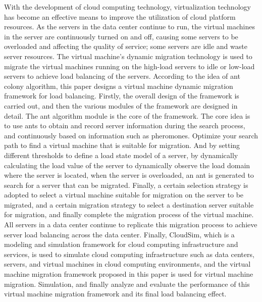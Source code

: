 \begin{enabstract}
  With the development of cloud computing technology, virtualization technology has become an effective means to improve the utilization of cloud platform resources. As the servers in the data center continue to run, the virtual machines in the server are continuously turned on and off, causing some servers to be overloaded and affecting the quality of service; some servers are idle and waste server resources. The virtual machine's dynamic migration technology is used to migrate the virtual machines running on the high-load servers to idle or low-load servers to achieve load balancing of the servers.
According to the idea of ant colony algorithm, this paper designs a virtual machine dynamic migration framework for load balancing. Firstly, the overall design of the framework is carried out, and then the various modules of the framework are designed in detail. The ant algorithm module is the core of the framework. The core idea is to use ants to obtain and record server information during the search process, and continuously based on information such as pheromones. Optimize your search path to find a virtual machine that is suitable for migration. And by setting different thresholds to define a load state model of a server, by dynamically calculating the load value of the server to dynamically observe the load domain where the server is located, when the server is overloaded, an ant is generated to search for a server that can be migrated. Finally, a certain selection strategy is adopted to select a virtual machine suitable for migration on the server to be migrated, and a certain migration strategy to select a destination server suitable for migration, and finally complete the migration process of the virtual machine. All servers in a data center continue to replicate this migration process to achieve server load balancing across the data center.
Finally, CloudSim, which is a modeling and simulation framework for cloud computing infrastructure and services, is used to simulate cloud computing infrastructure such as data centers, servers, and virtual machines in cloud computing environments, and the virtual machine migration framework proposed in this paper is used for virtual machine migration. Simulation, and finally analyze and evaluate the performance of this virtual machine migration framework and its final load balancing effect.

\end{enabstract}
